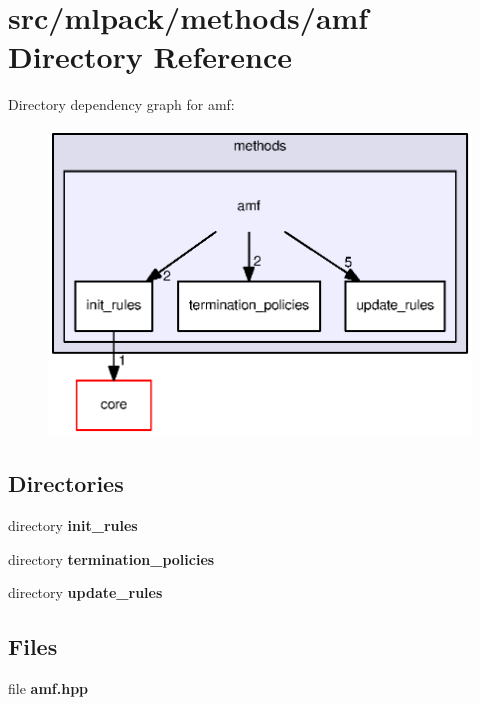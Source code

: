 \section{src/mlpack/methods/amf Directory Reference}
\label{dir_5d79f627790f2a48f4f1d0c9d0b8c107}
Directory dependency graph for amf\+:
\nopagebreak
\begin{figure}[H]
\begin{center}
\leavevmode
\includegraphics[width=350pt]{dir_5d79f627790f2a48f4f1d0c9d0b8c107_dep}
\end{center}
\end{figure}
\subsection*{Directories}
\begin{DoxyCompactItemize}
\item 
directory {\bf init\+\_\+rules}
\item 
directory {\bf termination\+\_\+policies}
\item 
directory {\bf update\+\_\+rules}
\end{DoxyCompactItemize}
\subsection*{Files}
\begin{DoxyCompactItemize}
\item 
file {\bf amf.\+hpp}
\end{DoxyCompactItemize}
